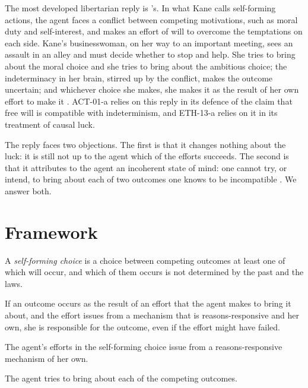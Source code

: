 \documentclass{situationist-preprint}
\begin{document}
The most developed libertarian reply is \citet{Kane1996}'s. In what Kane calls self-forming actions, the agent faces a conflict between competing motivations, such as moral duty and self-interest, and makes an effort of will to overcome the temptations on each side. Kane's businesswoman, on her way to an important meeting, sees an assault in an alley and must decide whether to stop and help. She tries to bring about the moral choice and she tries to bring about the ambitious choice; the indeterminacy in her brain, stirred up by the conflict, makes the outcome uncertain; and whichever choice she makes, she makes it as the result of her own effort to make it \citep{Kane1999}. ACT-01-a relies on this reply in its defence of the claim that free will is compatible with indeterminism, and ETH-13-a relies on it in its treatment of causal luck.

The reply faces two objections. The first is that it changes nothing about the luck: it is still not up to the agent which of the efforts succeeds. The second is that it attributes to the agent an incoherent state of mind: one cannot try, or intend, to bring about each of two outcomes one knows to be incompatible \citep{Bratman1987,Mele2006}. We answer both.

\section{Framework}

\begin{definition}\label{d:sfc}
A \emph{self-forming choice} is a choice between competing outcomes at least one of which will occur, and which of them occurs is not determined by the past and the laws.
\end{definition}

\begin{principle}[Attribution]\label{p:attr}
If an outcome occurs as the result of an effort that the agent makes to bring it about, and the effort issues from a mechanism that is reasons-responsive and her own, she is responsible for the outcome, even if the effort might have failed.
\end{principle}

\begin{assumption}[Control]\label{a:control}
The agent's efforts in the self-forming choice issue from a reasons-responsive mechanism of her own.
\end{assumption}

\begin{assumption}\label{a:dual}
The agent tries to bring about each of the competing outcomes.
\end{assumption}
\end{document}
